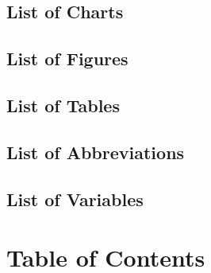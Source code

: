 \documentclass[
	12pt,
	]{article}
\numberwithin{equation}{section}
\theoremstyle{definition}
\theoremstyle{plain}
\theoremstyle{plain}
\theoremstyle{plain}
\begin{document}
\subsection*{List of Charts} %

\thispagestyle{empty}


\subsection*{List of Figures} %

\thispagestyle{empty}


\subsection*{List of Tables} %

\thispagestyle{empty}


\subsection*{List of Abbreviations} %

\thispagestyle{empty}


\subsection*{List of Variables} %

\thispagestyle{empty}

\newpage


\section*{Table of Contents}

{
	\setlength{\parskip}{1pt}
	\singlespacing
	\tableofcontents
}

\thispagestyle{empty}

\newpage

\end{document}
